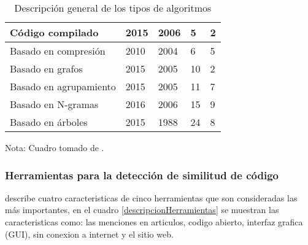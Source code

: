 \begin{table}[ht!]
\begin{tabular}{|lllll|}
\multicolumn{1}{|l|}{Código compilado}        & \multicolumn{1}{l|}{2015}       & \multicolumn{1}{l|}{2006}       & \multicolumn{1}{l|}{5}                 & 2           \\ \hline
\multicolumn{1}{|l|}{Basado en compresión}    & \multicolumn{1}{l|}{2010}       & \multicolumn{1}{l|}{2004}       & \multicolumn{1}{l|}{6}                 & 5           \\ \hline
\multicolumn{1}{|l|}{Basado en grafos}        & \multicolumn{1}{l|}{2015}       & \multicolumn{1}{l|}{2005}       & \multicolumn{1}{l|}{10}                & 2           \\ \hline
\multicolumn{1}{|l|}{Basado en agrupamiento}  & \multicolumn{1}{l|}{2015}       & \multicolumn{1}{l|}{2005}       & \multicolumn{1}{l|}{11}                & 7           \\ \hline
\multicolumn{1}{|l|}{Basado en N-gramas}      & \multicolumn{1}{l|}{2016}       & \multicolumn{1}{l|}{2006}       & \multicolumn{1}{l|}{15}                & 9           \\ \hline
\multicolumn{1}{|l|}{Basado en árboles}       & \multicolumn{1}{l|}{2015}       & \multicolumn{1}{l|}{1988}       & \multicolumn{1}{l|}{24}                & 8           \\ \hline
\end{tabular}
\caption{Descripción general de los tipos de algoritmos}
Nota: Cuadro tomado de \cite{Novak2019}.
\label{tiposDeAlgoritmos}
\end{table}
\subsubsection{Herramientas para la detección de similitud de código}
\cite{Novak2019} describe cuatro caracteristicas de cinco herramientas que son consideradas las más importantes, en el cuadro \ref{descripcionHerramientas} se muestran las caracteristicas como: las menciones en articulos, codigo abierto, interfaz grafica (GUI), sin conexion a internet y el sitio web.

